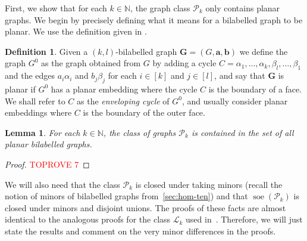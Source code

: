 \documentclass[11pt,a4paper]{article}
\theoremstyle{plain}
\newtheorem{lem}[thm]{Lemma}
\theoremstyle{remark}
\theoremstyle{definition}
\newtheorem{definition}[thm]{Definition}
\DeclareMathOperator{\soe}{soe}
\def\calP{{\mathcal P}} \def\calQ{{\mathcal Q}} \def\calR{{\mathcal R}}
\begin{document}
First, we show that for each $k \in \mathbb{N}$, the graph class $\calP_k$ only contains planar graphs. We begin by precisely defining what it means for a bilabelled graph to be planar. We use the definition given in \cite{david-laura}. 

\begin{definition}
    Given a $(k,l)$-bilabelled graph $\boldsymbol{G} = (G, \boldsymbol{a}, \boldsymbol{b})$ we define the graph $G^0$ as the graph obtained from $G$ 
    by adding a cycle $C = \alpha_1, \dots, \alpha_k, \beta_l, \dots , \beta_1$ 
    and the edges $a_i\alpha_i$ and $b_j\beta_j$ for each $i \in [k]$ and $j \in [l]$, and say that $\boldsymbol{G}$ is planar if $G^{0}$ has a planar embedding where the cycle $C$ is the boundary of a face. We shall refer to $C$ as the \emph{enveloping cycle} of $G^0$, and usually consider planar embeddings where $C$ is the boundary of the outer face.\end{definition}

\begin{lem}\label{lem:planar-class}
    For each $k \in \mathbb{N}$, the class of graphs $\calP_k$ is contained in the set of all planar bilabelled graphs. \end{lem}
\begin{proof}\textcolor{red}{TOPROVE 7}\end{proof}

\iffalse
\begin{figure}
 \centering 
  \texttt{[image: enveloping\_cycle.pdf]}
  \label{fig:enveloping_cycle}
  \caption{Parallel composition preserves planarity.}\end{figure}
\fi

We will also need that the class $\calP_k$ is closed under taking minors (recall the notion of minors of bilabelled graphs from~\cref{sec:hom-ten}) and that $\soe(\calP_k)$ is closed under minors and disjoint unions. The proofs of these facts are almost identical to the analogous proofs for the class $\mathcal{L}_k$ used in~\cite{roberson-seppelt-arxiv}. Therefore, we will just state the results and comment on the very minor differences in the proofs.
\end{document}

